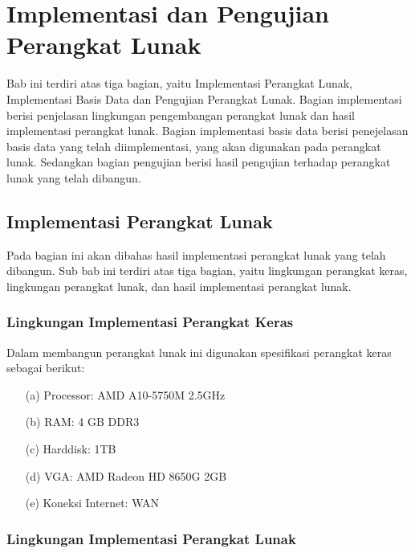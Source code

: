 \chapter{Implementasi dan Pengujian Perangkat Lunak}
\label{chap:implementasidanpengujian}

Bab ini terdiri atas tiga bagian, yaitu Implementasi Perangkat Lunak, Implementasi Basis Data dan Pengujian Perangkat Lunak. Bagian implementasi berisi penjelasan lingkungan pengembangan perangkat lunak dan hasil implementasi perangkat lunak. Bagian implementasi basis data berisi penejelasan basis data yang telah diimplementasi, yang akan digunakan pada perangkat lunak. Sedangkan bagian pengujian berisi hasil pengujian terhadap perangkat lunak yang telah dibangun.

\section{Implementasi Perangkat Lunak}
\label{sec:implementasiperangkatlunak}

Pada bagian ini akan dibahas hasil implementasi perangkat lunak yang telah dibangun. Sub bab ini terdiri atas tiga bagian, yaitu lingkungan perangkat keras, lingkungan perangkat lunak, dan hasil implementasi perangkat lunak.

\subsection{Lingkungan Implementasi Perangkat Keras}
\label{sec:lingkunganimplementasiperangkatkeras}

Dalam membangun perangkat lunak ini digunakan spesifikasi perangkat keras sebagai berikut:

\begin{enumerate}
\item[(a)] Processor: AMD A10-5750M 2.5GHz
\item[(b)] RAM: 4 GB DDR3
\item[(c)] Harddisk: 1TB
\item[(d)] VGA: AMD Radeon HD 8650G 2GB
\item[(e)] Koneksi Internet: WAN
\end{enumerate}

\subsection{Lingkungan Implementasi Perangkat Lunak}
\label{sec:lingkunganimplementasiperangkatlunak}


